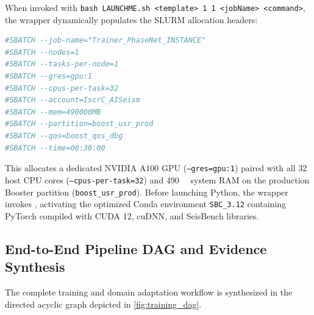 When invoked with \texttt{bash LAUNCHME.sh <template> 1 1 <jobName> <command>},
the wrapper dynamically populates the SLURM allocation headers:
\begin{lstlisting}[language=bash,basicstyle=\scriptsize\ttfamily]
#SBATCH --job-name="Trainer_PhaseNet_INSTANCE"
#SBATCH --nodes=1
#SBATCH --tasks-per-node=1
#SBATCH --gres=gpu:1
#SBATCH --cpus-per-task=32
#SBATCH --account=IscrC_AISeism
#SBATCH --mem=490000MB
#SBATCH --partition=boost_usr_prod
#SBATCH --qos=boost_qos_dbg
#SBATCH --time=00:30:00
\end{lstlisting}
This allocates a dedicated NVIDIA A100 \ac{GPU}
(\texttt{--gres=gpu:1}) paired with
all \num{32} host \ac{CPU} cores (\texttt{--cpus-per-task=32}) and
\qty{490}{\giga\byte}
system \ac{RAM} on the production Booster partition
(\texttt{boost\_usr\_prod}).
Before launching Python, the wrapper invokes , activating
the optimized Conda environment \texttt{SBC\_3.12} containing PyTorch
\parencite{PyTorch} compiled with CUDA 12, cuDNN, and SeisBench
\parencite{SeisBench} libraries.

\subsection{End-to-End Pipeline DAG and Evidence Synthesis}
\label{subsec:pipeline_dag_evidence}

The complete training and domain adaptation workflow is synthesized in the
directed acyclic graph depicted in \cref{fig:training_dag}.

